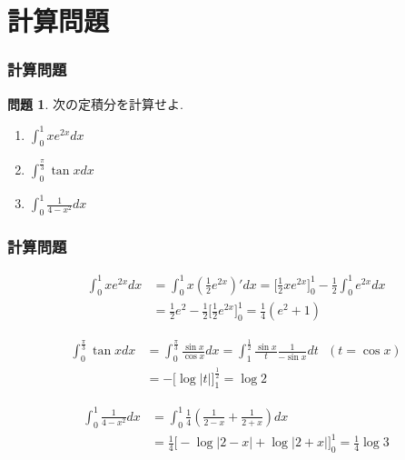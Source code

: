 \documentclass[dvipdfmx,cjk,10.2pt]{beamer}
\theoremstyle{definition}
\newtheorem{Prob}[Thm]{問題}
\begin{document}
\section{計算問題}

\begin{frame}
\frametitle{計算問題}

\begin{Prob}
次の定積分を計算せよ. 
\begin{enumerate} 
\item $\int_0^1x e^{2x}dx$
\item $\int_{0}^\frac{\pi}{3} \tan xdx$
\item $\int_0^1\frac{1}{4-x^2}dx$
\end{enumerate}
\end{Prob}

\end{frame}




\begin{frame}
\frametitle{計算問題}


\begin{align*}
\int_0^1x e^{2x}dx & = \int_0^1 x (\frac{1}{2}e^{2x})'dx = \big[\frac{1}{2}xe^{2x}\big]_0^1- \frac{1}{2} \int_0^1e^{2x}dx \\
& = \frac{1}{2}e^2-\frac{1}{2}\big[\frac{1}{2}e^{2x}\big]_0^1=\frac{1}{4}(e^2+1)
\end{align*}

\begin{align*}
\int_0^\frac{\pi}{3} \tan x dx & =\int_0^\frac{\pi}{3} \frac{\sin x}{\cos x} dx = \int_{1}^\frac{1}{2}\frac{\sin x}{t} \frac{1}{-\sin x}dt \ \ \ (t=\cos x) \\
& = -\big[\log|t|\big]_{1}^\frac{1}{2}= \log 2 
\end{align*}

\begin{align*}
\int_0^1\frac{1}{4-x^2}dx & = \int_0^1\frac{1}{4}(\frac{1}{2-x}+\frac{1}{2+x})dx \\
& = \frac{1}{4}\big[-\log|2-x|+\log|2+x|\big]_0^1=\frac{1}{4}\log 3
\end{align*}
\end{frame}
\end{document}
